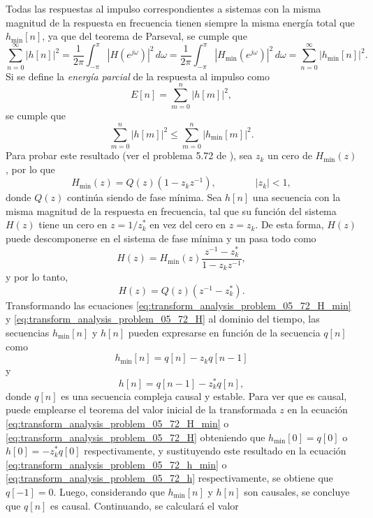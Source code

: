 \documentclass[a4paper]{report}
\begin{document}
Todas las respuestas al impulso correspondientes a sistemas con la misma magnitud de la respuesta en frecuencia tienen siempre la misma energía total que \(h_\textrm{min}[n]\), ya que del teorema de Parseval, se cumple que
\[
 \sum_{n=0}^\infty|h[n]|^2=\frac{1}{2\pi}\int_{-\pi}^\pi|H(e^{j\omega})|^2\,d\omega
   =\frac{1}{2\pi}\int_{-\pi}^\pi|H_\textrm{min}(e^{j\omega})|^2\,d\omega
   =\sum_{n=0}^\infty|h_\textrm{min}[n]|^2.
\]
Si se define la \emph{energía parcial} de la respuesta al impulso como 
\[
 E[n]=\sum_{m=0}^n|h[m]|^2,
\]
se cumple que 
\begin{equation}\label{eq:transform_analysis_minimum_delay_partial_energy}
 \sum_{m=0}^n|h[m]|^2\leq\sum_{m=0}^n|h_\textrm{min}[m]|^2. 
\end{equation}
Para probar este resultado (ver el problema 5.72 de \cite{oppenheim2009discrete}), sea \(z_k\) un cero de \(H_\textrm{min}(z)\), por lo que
\begin{equation}\label{eq:transform_analysis_problem_05_72_H_min}
 H_\textrm{min}(z)=Q(z)(1-z_kz^{-1}),
 \qquad\qquad 
 |z_k|<1, 
\end{equation}
donde \(Q(z)\) continúa siendo de fase mínima. Sea \(h[n]\) una secuencia con la misma magnitud de la respuesta en frecuencia, tal que su función del sistema \(H(z)\) tiene un cero en \(z=1/z^*_k\) en vez del cero en \(z=z_k\). De esta forma, \(H(z)\) puede descomponerse en el sistema de fase mínima y un pasa todo como 
\[
 H(z)=H_\textrm{min}(z)\frac{z^{-1}-z_k^*}{1-z_kz^{-1}},
\]
y por lo tanto,
\begin{equation}\label{eq:transform_analysis_problem_05_72_H}
 H(z)=Q(z)(z^{-1}-z_k^*). 
\end{equation}
Transformando las ecuaciones \ref{eq:transform_analysis_problem_05_72_H_min} y \ref{eq:transform_analysis_problem_05_72_H} al dominio del tiempo, las secuencias \(h_\textrm{min}[n]\) y \(h[n]\) pueden expresarse en función de la secuencia \(q[n]\) como
\begin{equation}\label{eq:transform_analysis_problem_05_72_h_min}
 h_\textrm{min}[n]=q[n]-z_kq[n-1]
\end{equation}
y  
\begin{equation}\label{eq:transform_analysis_problem_05_72_h}
 h[n]=q[n-1]-z_k^*q[n],
\end{equation}
donde \(q[n]\) es una secuencia compleja causal y estable. Para ver que es causal, puede emplearse el teorema del valor inicial de la transformada \(z\) en la ecuación \ref{eq:transform_analysis_problem_05_72_H_min} o \ref{eq:transform_analysis_problem_05_72_H} obteniendo que \(h_\textrm{min}[0]=q[0]\) o \(h[0]=-z_k^*q[0]\) respectivamente, y sustituyendo este resultado en la ecuación \ref{eq:transform_analysis_problem_05_72_h_min} o \ref{eq:transform_analysis_problem_05_72_h} respectivamente, se obtiene que \(q[-1]=0\). Luego, considerando que \(h_\textrm{min}[n]\) y \(h[n]\) son causales, se concluye que \(q[n]\) es causal. Continuando, se calculará el valor
\end{document}
